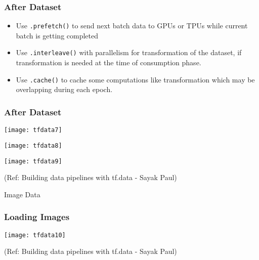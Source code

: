 \begin{frame}[fragile]\frametitle{After Dataset}
\begin{itemize}
\item Use \lstinline|.prefetch()| to send next batch data to GPUs or TPUs while current batch is getting completed
\item Use \lstinline|.interleave()| with parallelism for transformation of the dataset, if transformation is needed at the time of consumption phase. 
\item Use \lstinline|.cache()| to cache some computations like transformation which may be overlapping during each epoch.
\end{itemize}


\end{frame}

\begin{frame}[fragile]\frametitle{After Dataset}


\begin{center}
\texttt{[image: tfdata7]}

\texttt{[image: tfdata8]}


\texttt{[image: tfdata9]}

{\tiny (Ref: Building data pipelines with tf.data - Sayak Paul)}

\end{center}
\end{frame}


\begin{frame}
  \begin{center}
    {\Large Image Data}
	
  \end{center}
\end{frame}


\begin{frame}[fragile]\frametitle{Loading Images}

\begin{center}
\texttt{[image: tfdata10]}

{\tiny (Ref: Building data pipelines with tf.data - Sayak Paul)}

\end{center}
\end{frame}



